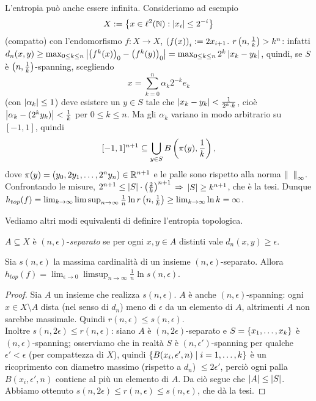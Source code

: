 \begin{esempio}L'entropia può anche essere infinita. Consideriamo ad esempio
\[ X:=\left\{x\in\ell^2(\mathbb{N}):\left|x_i\right|\le 2^{-i}\right\} \]
(compatto) con l'endomorfismo $f:X\to X$, $\left(f(x)\right)_i:=2x_{i+1}$. \Eacc $r\left(n,\frac{1}{k}\right)>k^n$:
infatti $d_n(x,y)\ge\max_{0\le k\le n}\left|\left(f^k(x)\right)_0-\left(f^k(y)\right)_0\right|=\max_{0\le k\le n}2^k\left|x_k-y_k\right|$,
quindi, se $S$ è $\left(n,\frac{1}{k}\right)$-spanning, scegliendo
\[ x=\sum_{k=0}^n\alpha_k 2^{-k}e_k \]
(con $\left|\alpha_k\right|\le 1$) deve esistere un $y\in S$ tale che $\left|x_k-y_k\right|<\frac{1}{2^k\cdot k}$,
cioè $\left|\alpha_k-(2^k y_k)\right|<\frac{1}{k}$ per $0\le k\le n$.
Ma gli $\alpha_k$ variano in modo arbitrario su $[-1,1]$, quindi
\[ [-1,1]^{n+1}\subseteq \bigcup_{y\in S}B\left(\pi(y),\frac{1}{k}\right), \]
dove $\pi(y)=(y_0,2y_1,\dots,2^n y_n)\in \mathbb{R}^{n+1}$ e le palle sono rispetto alla norma $\norm{\fantasma{a}}_\infty$.
Confrontando le misure, $2^{n+1}\le \left|S\right|\cdot\left(\frac{2}{k}\right)^{n+1}$ $\Rightarrow$ $\left|S\right|\ge k^{n+1}$, che è la tesi. 
Dunque $h_{top}(f)=\lim_{k\to\infty}\limsup_{n\to\infty}\frac{1}{n}\ln r\left(n,\frac{1}{k}\right)\ge\lim_{k\to\infty}\ln k=\infty$.
\end{esempio}

Vediamo altri modi equivalenti di definire l'entropia topologica.

\begin{defi}$A\subseteq X$ è $(n,\epsilon)$-\emph{separato} se per ogni $x,y\in A$ distinti
vale $d_n(x,y)\ge\epsilon$.
\end{defi}

\begin{prop}Sia $s(n,\epsilon)$ la massima cardinalità di un insieme $(n,\epsilon)$-separato.
Allora $h_{top}(f)=\lim_{\epsilon\to 0}\limsup_{n\to\infty}\frac{1}{n}\ln s(n,\epsilon)$.
\end{prop}

\begin{proof}Sia $A$ un insieme che realizza $s(n,\epsilon)$. $A$ è anche $(n,\epsilon)$-spanning:
ogni $x\in X\setminus A$ dista (nel senso di $d_n$) meno di $\epsilon$ da un elemento di $A$, altrimenti $A$
non sarebbe massimale. Quindi $r(n,\epsilon)\le s(n,\epsilon)$. \\
Inoltre $s(n,2\epsilon)\le r(n,\epsilon)$: siano $A$ è $(n,2\epsilon)$-separato
e $S=\left\{x_1,\dots,x_k\right\}$ è $(n,\epsilon)$-spanning; osserviamo che in realtà
$S$ è $(n,\epsilon')$-spanning per qualche $\epsilon'<\epsilon$ (per compattezza di $X$),
quindi $\left\{B(x_i,\epsilon',n)\mid i=1,\dots,k\right\}$ è un ricoprimento con diametro massimo (rispetto a $d_n$) $\le 2\epsilon'$,
perciò ogni palla $B(x_i,\epsilon',n)$ contiene al più un elemento di $A$.
Da ciò segue che $\left|A\right|\le\left|S\right|$. \\
Abbiamo ottenuto $s(n,2\epsilon)\le r(n,\epsilon)\le s(n,\epsilon)$, che dà la tesi.
\end{proof}

